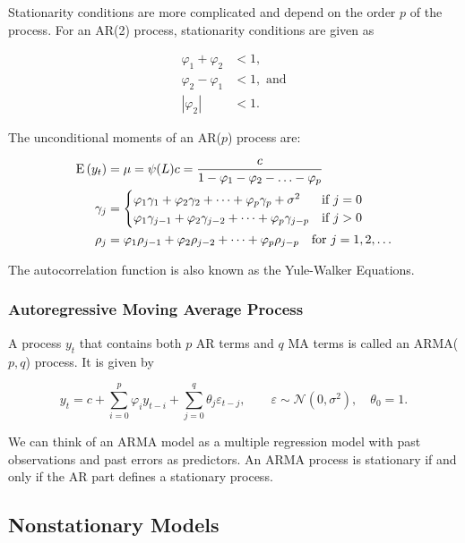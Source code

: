 Stationarity conditions are more complicated and depend on the order $p$ of the process. For an AR(2) process, stationarity conditions are given as

\begin{align*}
	\varphi_1 + \varphi_2 &< 1, \\
	\varphi_2 - \varphi_1 &< 1, \text{ and} \\
	|\varphi_2| &< 1.
\end{align*}

The unconditional moments of an AR($p$) process are:

\begin{align*}
	\mathrm{E}\left({y_t}\right) &= \mu = \psi(L)c = \frac{c}{1-\varphi_1 - \varphi_2 - \ldots - \varphi_p} \\
	\gamma_j &= 
	\begin{cases}
		\varphi_1\gamma_1 + \varphi_2\gamma_2 + \dots + \varphi_p\gamma_p + \sigma^2 & \text{if } j = 0 \\
		\varphi_1\gamma_{j-1} + \varphi_2\gamma_{j-2} + \dots + \varphi_p\gamma_{j-p} & \text{if } j > 0 
	\end{cases}
	\\
	\rho_j &= \varphi_1\rho_{j-1} + \varphi_2\rho_{j-2} + \dots + \varphi_p\rho_{j-p} \quad \text{for } j = 1,2,\dots
\end{align*}

The autocorrelation function is also known as the Yule-Walker Equations.

\subsubsection{Autoregressive Moving Average Process}

A process $y_t$ that contains both $p$ AR terms and $q$ MA terms is called an ARMA($p,q$) process. It is given by

\begin{equation}
	y_t = c + \sum^p_{i=0}\varphi_iy_{t-i} + \sum^q_{j=0}\theta_j\varepsilon_{t-j}, \qquad \varepsilon\sim\mathcal{N}(0,\sigma^2),\quad\theta_0 = 1.
\end{equation}

We can think of an ARMA model as a multiple regression model with past observations and past errors as predictors. An ARMA process is stationary if and only if the AR part defines a stationary process.

\subsection{Nonstationary Models}

